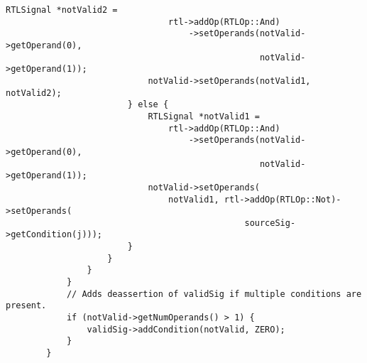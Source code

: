 \begin{lstlisting}[capton={Source Code: Generating valid signals},label=sec:validsinglssourcecode]
                            RTLSignal *notValid2 =
                                rtl->addOp(RTLOp::And)
                                    ->setOperands(notValid->getOperand(0),
                                                  notValid->getOperand(1));
                            notValid->setOperands(notValid1, notValid2);
                        } else {
                            RTLSignal *notValid1 =
                                rtl->addOp(RTLOp::And)
                                    ->setOperands(notValid->getOperand(0),
                                                  notValid->getOperand(1));
                            notValid->setOperands(
                                notValid1, rtl->addOp(RTLOp::Not)->setOperands(
                                               sourceSig->getCondition(j)));
                        }
                    }
                }
            }
            // Adds deassertion of validSig if multiple conditions are present.
            if (notValid->getNumOperands() > 1) {
                validSig->addCondition(notValid, ZERO);
            }
        }
\end{lstlisting}
